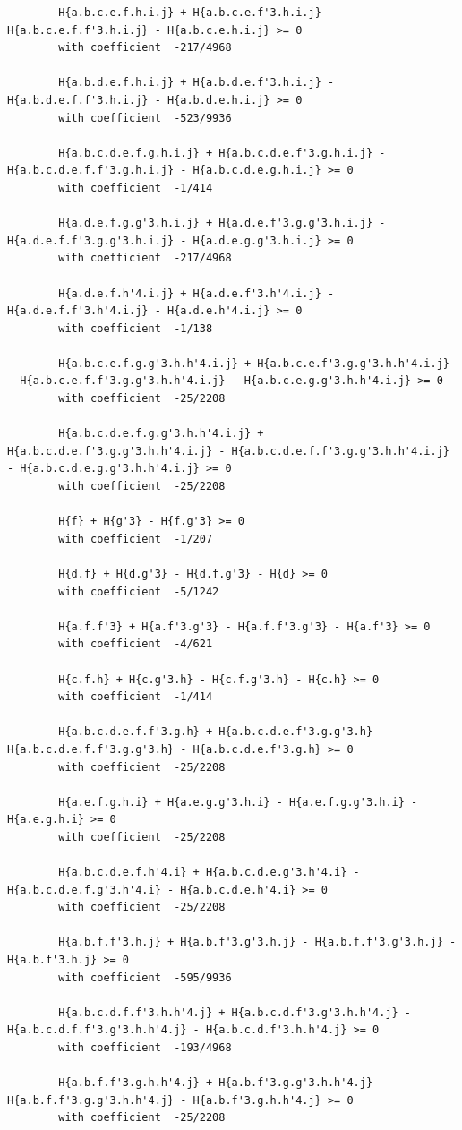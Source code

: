 \documentclass[11pt, a4paper]{kybernetika}
\begin{document}
\begin{verbatim}
		H{a.b.c.e.f.h.i.j} + H{a.b.c.e.f'3.h.i.j} - H{a.b.c.e.f.f'3.h.i.j} - H{a.b.c.e.h.i.j} >= 0
		with coefficient  -217/4968
		
		H{a.b.d.e.f.h.i.j} + H{a.b.d.e.f'3.h.i.j} - H{a.b.d.e.f.f'3.h.i.j} - H{a.b.d.e.h.i.j} >= 0
		with coefficient  -523/9936
		
		H{a.b.c.d.e.f.g.h.i.j} + H{a.b.c.d.e.f'3.g.h.i.j} - H{a.b.c.d.e.f.f'3.g.h.i.j} - H{a.b.c.d.e.g.h.i.j} >= 0
		with coefficient  -1/414
		
		H{a.d.e.f.g.g'3.h.i.j} + H{a.d.e.f'3.g.g'3.h.i.j} - H{a.d.e.f.f'3.g.g'3.h.i.j} - H{a.d.e.g.g'3.h.i.j} >= 0
		with coefficient  -217/4968
		
		H{a.d.e.f.h'4.i.j} + H{a.d.e.f'3.h'4.i.j} - H{a.d.e.f.f'3.h'4.i.j} - H{a.d.e.h'4.i.j} >= 0
		with coefficient  -1/138
		
		H{a.b.c.e.f.g.g'3.h.h'4.i.j} + H{a.b.c.e.f'3.g.g'3.h.h'4.i.j} - H{a.b.c.e.f.f'3.g.g'3.h.h'4.i.j} - H{a.b.c.e.g.g'3.h.h'4.i.j} >= 0
		with coefficient  -25/2208
		
		H{a.b.c.d.e.f.g.g'3.h.h'4.i.j} + H{a.b.c.d.e.f'3.g.g'3.h.h'4.i.j} - H{a.b.c.d.e.f.f'3.g.g'3.h.h'4.i.j} - H{a.b.c.d.e.g.g'3.h.h'4.i.j} >= 0
		with coefficient  -25/2208
		
		H{f} + H{g'3} - H{f.g'3} >= 0
		with coefficient  -1/207
		
		H{d.f} + H{d.g'3} - H{d.f.g'3} - H{d} >= 0
		with coefficient  -5/1242
		
		H{a.f.f'3} + H{a.f'3.g'3} - H{a.f.f'3.g'3} - H{a.f'3} >= 0
		with coefficient  -4/621
		
		H{c.f.h} + H{c.g'3.h} - H{c.f.g'3.h} - H{c.h} >= 0
		with coefficient  -1/414
		
		H{a.b.c.d.e.f.f'3.g.h} + H{a.b.c.d.e.f'3.g.g'3.h} - H{a.b.c.d.e.f.f'3.g.g'3.h} - H{a.b.c.d.e.f'3.g.h} >= 0
		with coefficient  -25/2208
		
		H{a.e.f.g.h.i} + H{a.e.g.g'3.h.i} - H{a.e.f.g.g'3.h.i} - H{a.e.g.h.i} >= 0
		with coefficient  -25/2208
		
		H{a.b.c.d.e.f.h'4.i} + H{a.b.c.d.e.g'3.h'4.i} - H{a.b.c.d.e.f.g'3.h'4.i} - H{a.b.c.d.e.h'4.i} >= 0
		with coefficient  -25/2208
		
		H{a.b.f.f'3.h.j} + H{a.b.f'3.g'3.h.j} - H{a.b.f.f'3.g'3.h.j} - H{a.b.f'3.h.j} >= 0
		with coefficient  -595/9936
		
		H{a.b.c.d.f.f'3.h.h'4.j} + H{a.b.c.d.f'3.g'3.h.h'4.j} - H{a.b.c.d.f.f'3.g'3.h.h'4.j} - H{a.b.c.d.f'3.h.h'4.j} >= 0
		with coefficient  -193/4968
		
		H{a.b.f.f'3.g.h.h'4.j} + H{a.b.f'3.g.g'3.h.h'4.j} - H{a.b.f.f'3.g.g'3.h.h'4.j} - H{a.b.f'3.g.h.h'4.j} >= 0
		with coefficient  -25/2208
		

\end{verbatim}
\end{document}
